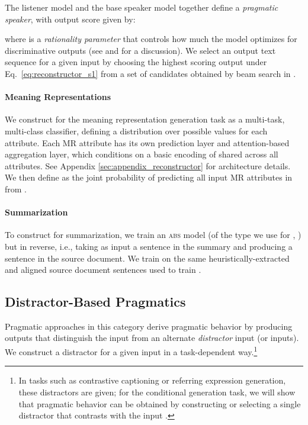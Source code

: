 \documentclass[11pt,a4paper]{article}
\newcommand{\basespk}[0]{\xspace}
\newcommand{\ie}{i.e., }
\begin{document}
The listener model and the base speaker model together define a \emph{pragmatic speaker}, with output score given by:

where  is a \emph{rationality parameter} that controls how much the model optimizes for discriminative outputs (see \citet{monroe2017colors} and \citet{fried2017unified} for a discussion). We select an output text sequence  for a given input  by choosing the highest scoring output under Eq.\ \ref{eq:reconstructor_s1} from a set of candidates obtained by beam search in .



\paragraph{Meaning Representations}
We construct  for the meaning representation generation task as a multi-task, multi-class classifier, defining a distribution over possible values for each attribute.
Each MR attribute has its own prediction layer and attention-based aggregation layer, which conditions on
a basic encoding of  shared across all attributes.
See Appendix \ref{sec:appendix_reconstructor} for architecture details.
We then define  as the joint probability of predicting all input MR attributes in  from .


\paragraph{Summarization}
To construct  for summarization, we train an \textsc{abs} model (of the type we use for \basespk, \citet{chen2018fast}) but in reverse, \ie taking as input a sentence in the summary and producing a sentence in the source document. We train  on the same heuristically-extracted and aligned source document sentences used to train \basespk \cite{chen2018fast}. 




\subsection{Distractor-Based Pragmatics}
\label{sec:pragd}
Pragmatic approaches in this category \cite{frank2012predicting,Andreas16Pragmatics,vedantam2017captions,cohn2018pragmatically} derive pragmatic behavior by producing outputs that distinguish the input  from an alternate \emph{distractor} input (or inputs). 
We construct a distractor  for a given input  in a task-dependent way.\footnote{In tasks such as contrastive captioning or referring expression generation, these distractors are given; for the conditional generation task, we will show that pragmatic behavior can be obtained 
by constructing or selecting a single distractor that contrasts with the input .}
\end{document}
